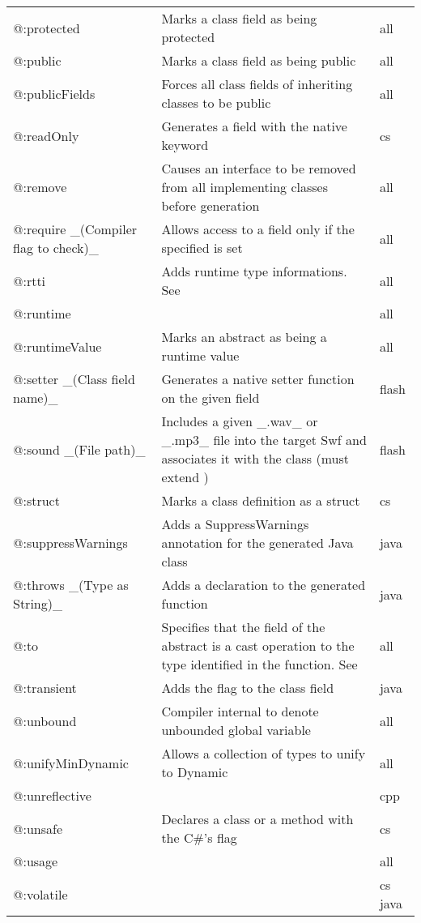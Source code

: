 \begin{center}
\begin{tabular}{| l | l | l |}
	@:protected  &  Marks a class field as being protected  &  all \\
	@:public  &  Marks a class field as being public  &  all \\
	@:publicFields  &  Forces all class fields of inheriting classes to be public  &  all \\
	@:readOnly  &  Generates a field with the \expr{readonly} native keyword   &  cs \\
	@:remove  &  Causes an interface to be removed from all implementing classes before generation  &  all \\
	@:require \_(Compiler flag to check)\_  &  Allows access to a field only if the specified \tref{compiler flag}{lf-condition-compilation} is set  &  all \\
	@:rtti   &  Adds runtime type informations. See \tref{RTTI}{cr-rtti}  &  all \\
	@:runtime  &    &  all \\
	@:runtimeValue  &  Marks an abstract as being a runtime value  &  all \\
	@:setter \_(Class field name)\_  &  Generates a native setter function on the given field   &  flash \\
	@:sound \_(File path)\_  &  Includes a given \_.wav\_ or \_.mp3\_ file into the target Swf and associates it with the class (must extend \expr{flash.media.Sound})  &  flash \\
	@:struct  &  Marks a class definition as a struct   &  cs \\
	@:suppressWarnings  &  Adds a SuppressWarnings annotation for the generated Java class  &  java \\
	@:throws \_(Type as String)\_  &  Adds a \expr{throws} declaration to the generated function   &  java \\
	@:to  &  Specifies that the field of the abstract is a cast operation to the type identified in the function. See \tref{Implicit Casts}{types-abstract-implicit-casts} & all \\
	@:transient  &  Adds the \expr{transient} flag to the class field  &  java \\
	@:unbound  &  Compiler internal to denote unbounded global variable  &  all \\
	@:unifyMinDynamic  &  Allows a collection of types to unify to Dynamic  &  all \\
	@:unreflective  &    &  cpp \\
	@:unsafe  &  Declares a class  or a method with the C\#'s \expr{unsafe} flag   &  cs \\
	@:usage  &    &  all \\
	@:volatile  &    &  cs  java \\
\end{tabular}
\end{center}


